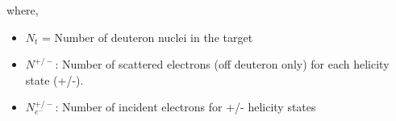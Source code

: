 where, 
\begin{itemize}
  \item $N_t$ = Number of deuteron nuclei in the target 
  
\begin{comment}  
  \item $N_t$ = Number of deuteron nuclei in the target = $3 N_a l_A \frac{\rho_A}{m_A}$, with 
    \begin{itemize}
      \item 3: number of Deuteron atoms in a \hnd3 molecule
      \item $N_a = 6.02\times 10^{23}$: Avogadro's number
      \item $l_A =$ target length (cm) $\times$ packing fraction
      \item $\rho_A = 1.056 (g/cm^3)$: Target density
      \item $m_A = 21.042414237 (g)$: Mass of target molecule \hnd3   %
    \end{itemize}
\end{comment}
    
  \item $N^{+/-}$: Number of scattered electrons (off deuteron only) for each helicity state (+/-).
  \item $N^{+/-}_{e^-}$: Number of incident electrons for +/- helicity states 
  

\end{itemize}

